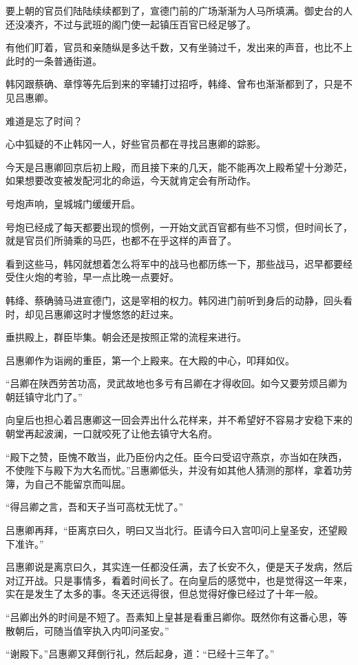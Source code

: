 要上朝的官员们陆陆续续都到了，宣德门前的广场渐渐为人马所填满。御史台的人还没凑齐，不过与武班的阁门使一起镇压百官已经足够了。

有他们盯着，官员和亲随纵是多达千数，又有坐骑过千，发出来的声音，也比不上此时的一条普通街道。

韩冈跟蔡确、章惇等先后到来的宰辅打过招呼，韩绛、曾布也渐渐都到了，只是不见吕惠卿。

难道是忘了时间？

心中狐疑的不止韩冈一人，好些官员都在寻找吕惠卿的踪影。

今天是吕惠卿回京后初上殿，而且接下来的几天，能不能再次上殿希望十分渺茫，如果想要改变被发配河北的命运，今天就肯定会有所动作。

号炮声响，皇城城门缓缓开启。

号炮已经成了每天都要出现的惯例，一开始文武百官都有些不习惯，但时间长了，就是官员们所骑乘的马匹，也都不在乎这样的声音了。

看到这些马，韩冈就想着怎么将军中的战马也都历练一下，那些战马，迟早都要经受住火炮的考验，早一点比晚一点要好。

韩绛、蔡确骑马进宣德门，这是宰相的权力。韩冈进门前听到身后的动静，回头看时，却见吕惠卿这时才慢悠悠的赶过来。

垂拱殿上，群臣毕集。朝会还是按照正常的流程来进行。

吕惠卿作为诣阙的重臣，第一个上殿来。在大殿的中心，叩拜如仪。

“吕卿在陕西劳苦功高，灵武故地也多亏有吕卿在才得收回。如今又要劳烦吕卿为朝廷镇守北门了。”

向皇后也担心着吕惠卿这一回会弄出什么花样来，并不希望好不容易才安稳下来的朝堂再起波澜，一口就咬死了让他去镇守大名府。

“殿下之赞，臣愧不敢当，此乃臣份内之任。臣今曰受诏守燕京，亦当如在陕西，不使陛下与殿下为大名而忧。”吕惠卿低头，并没有如其他人猜测的那样，拿着功劳簿，为自己不能留京而叫屈。

“得吕卿之言，吾和天子当可高枕无忧了。”

吕惠卿再拜，“臣离京曰久，明曰又当北行。臣请今曰入宫叩问上皇圣安，还望殿下准许。”

吕惠卿说是离京曰久，其实连一任都没任满，去了长安不久，便是天子发病，然后对辽开战。只是事情多，看着时间长了。在向皇后的感觉中，也是觉得这一年来，实在是发生了太多的事。冬天还远得很，但总觉得好像已经过了十年一般。

“吕卿出外的时间是不短了。吾素知上皇甚是看重吕卿你。既然你有这番心思，等散朝后，可随当值宰执入内叩问圣安。”

“谢殿下。”吕惠卿又拜倒行礼，然后起身，道：“已经十三年了。”

